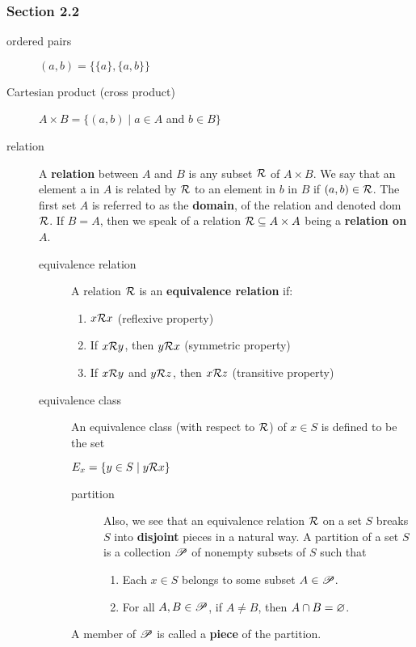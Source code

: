 \documentclass[12pt]{article}
\begin{document}
\subsubsection{Section 2.2}
\label{sec:org0a52a8c}
\begin{description}
\item[{ordered pairs}] \((a,b)=\{\{a\},\{a,b\}\}\)
\item[{Cartesian product (cross product)}] \(A\times{}B=\{(a,b)\mid{}a\in{}A\) and \(b\in{}B\}\)
\item[{relation}] A \textbf{relation} between \(A\) and \(B\) is any subset \(\mathcal{R}\) of \(A\times{}B\). We say
that an element a in \(A\) is related by \(\mathcal{R}\) to an element in \(b\) in
\(B\) if \((a,b)\in{}\mathcal{R}\). The first set \(A\) is referred to as the \textbf{domain},
of the relation and denoted dom \(\mathcal{R}\). If \(B=A\), then we speak of a
relation \(\mathcal{R}\subseteq{}A\times{}A\) being a \textbf{relation on} \(A\).
\begin{description}
\item[{equivalence relation}] A relation \(\mathcal{R}\) is an \textbf{equivalence relation} if:
\begin{enumerate}
\item \(x\mathcal{R}{}x\) \hfill (reflexive property)
\item If \(x\mathcal{R}{}y\), then \(y\mathcal{R}{}x\) \hfill (symmetric property)
\item If \(x\mathcal{R}{}y\) and \(y\mathcal{R}{}z\), then \(x\mathcal{R}{}z\) \hfill (transitive property)
\end{enumerate}
\item[{equivalence class}] An equivalence class (with respect to \(\mathcal{R}\)) of \(x\in{}S\) is
defined to be the set
\begin{center}
\(E_{x}=\{y\in{}S\mid{}y\mathcal{R}{}x\}\)
\end{center}
\begin{description}
\item[{partition}] Also, we see that an equivalence relation \(\mathcal{R}\) on a set \(S\)
breaks \(S\) into \textbf{disjoint} pieces in a natural way. A partition
of a set \(S\) is a collection \(\mathscr{P}\) of nonempty subsets of
\(S\) such that
\begin{enumerate}
\item Each \(x\in{}S\) belongs to some subset \(A\in\mathscr{P}\).
\item For all \(A,B\in\mathscr{P}\), if \(A\ne{}B\), then \(A\cap{}B=\varnothing\).
\end{enumerate}
\end{description}
A member of \(\mathscr{P}\) is called a \textbf{piece} of the partition.
\end{description}
\end{description}
\end{document}
